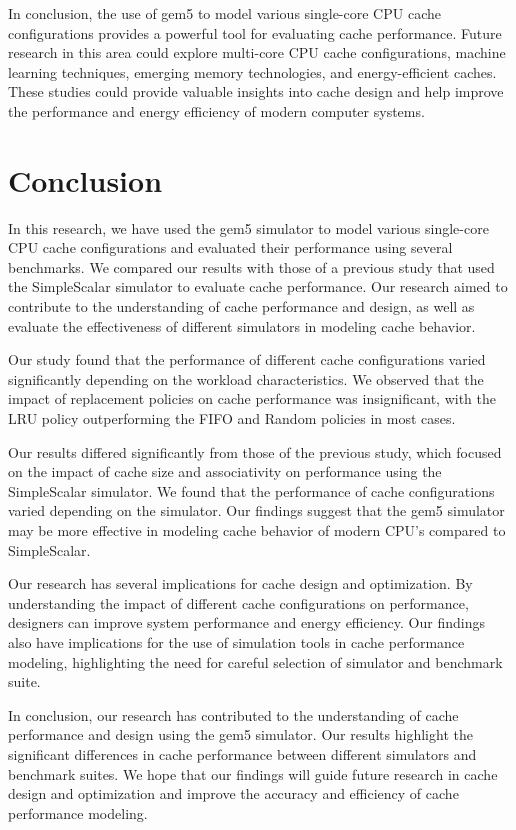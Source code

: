 \documentclass[conference]{IEEEtran}
\begin{document}
In conclusion, the use of gem5 to model various single-core CPU cache configurations provides a powerful tool for evaluating cache performance. Future research in this area could explore multi-core CPU cache configurations, machine learning techniques, emerging memory technologies, and energy-efficient caches. These studies could provide valuable insights into cache design and help improve the performance and energy efficiency of modern computer systems.

\section{Conclusion}
In this research, we have used the gem5 simulator to model various single-core CPU cache configurations and evaluated their performance using several benchmarks. We compared our results with those of a previous study that used the SimpleScalar simulator to evaluate cache performance. Our research aimed to contribute to the understanding of cache performance and design, as well as evaluate the effectiveness of different simulators in modeling cache behavior.

Our study found that the performance of different cache configurations varied significantly depending on the workload characteristics. We observed that the impact of replacement policies on cache performance was insignificant, with the LRU policy outperforming the FIFO and Random policies in most cases.

Our results differed significantly from those of the previous study, which focused on the impact of cache size and associativity on performance using the SimpleScalar simulator. We found that the performance of cache configurations varied depending on the simulator. Our findings suggest that the gem5 simulator may be more effective in modeling cache behavior of modern CPU's compared to SimpleScalar.

Our research has several implications for cache design and optimization. By understanding the impact of different cache configurations on performance, designers can improve system performance and energy efficiency. Our findings also have implications for the use of simulation tools in cache performance modeling, highlighting the need for careful selection of simulator and benchmark suite.

In conclusion, our research has contributed to the understanding of cache performance and design using the gem5 simulator. Our results highlight the significant differences in cache performance between different simulators and benchmark suites. We hope that our findings will guide future research in cache design and optimization and improve the accuracy and efficiency of cache performance modeling.

\printbibliography
\end{document}
